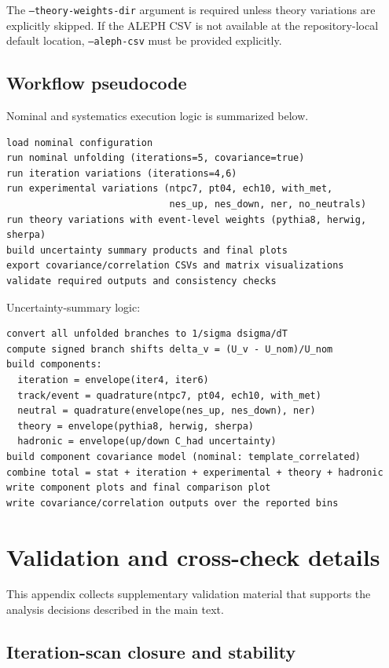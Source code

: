 The \texttt{--theory-weights-dir} argument is required unless theory variations are
explicitly skipped. If the ALEPH CSV is not available at the repository-local default
location, \texttt{--aleph-csv} must be provided explicitly.

\subsection{Workflow pseudocode}

Nominal and systematics execution logic is summarized below.

\begin{verbatim}
load nominal configuration
run nominal unfolding (iterations=5, covariance=true)
run iteration variations (iterations=4,6)
run experimental variations (ntpc7, pt04, ech10, with_met,
                             nes_up, nes_down, ner, no_neutrals)
run theory variations with event-level weights (pythia8, herwig, sherpa)
build uncertainty summary products and final plots
export covariance/correlation CSVs and matrix visualizations
validate required outputs and consistency checks
\end{verbatim}

Uncertainty-summary logic:
\begin{verbatim}
convert all unfolded branches to 1/sigma dsigma/dT
compute signed branch shifts delta_v = (U_v - U_nom)/U_nom
build components:
  iteration = envelope(iter4, iter6)
  track/event = quadrature(ntpc7, pt04, ech10, with_met)
  neutral = quadrature(envelope(nes_up, nes_down), ner)
  theory = envelope(pythia8, herwig, sherpa)
  hadronic = envelope(up/down C_had uncertainty)
build component covariance model (nominal: template_correlated)
combine total = stat + iteration + experimental + theory + hadronic
write component plots and final comparison plot
write covariance/correlation outputs over the reported bins
\end{verbatim}

\section{Validation and cross-check details}
\label{sec:app_validation}

This appendix collects supplementary validation material that supports the analysis decisions described in the main text.

\subsection{Iteration-scan closure and stability}


